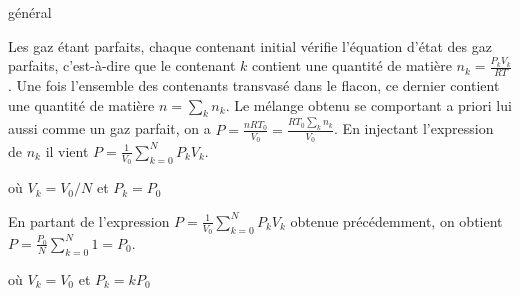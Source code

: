 \debutEntrainement


\begin{enonce}
général
\end{enonce}


\begin{corrige}
Les gaz étant parfaits, chaque contenant initial vérifie l'équation d'état des gaz parfaits, c'est-à-dire que le contenant $k$ contient une quantité de matière $n_k=\frac{P_kV_k}{RT}$. Une fois l'ensemble des contenants transvasé dans le flacon, ce dernier contient une quantité de matière $n=\textstyle \sum_{k} n_k$. Le mélange obtenu se comportant a priori lui aussi comme un gaz parfait, on a $P=\frac{nRT_0}{V_0}=\frac{RT_0 \sum_{k} n_k}{V_0}$. En injectant l'expression de $n_k$ il vient $P=\frac{1}{V_0} \sum_{k=0}^N P_k V_k$. 
\end{corrige}



\begin{enonce}
où $V_k=V_0/N$ et $P_k=P_0$
\end{enonce}


\begin{corrige}
En partant de l'expression $P=\frac{1}{V_0} \sum_{k=0}^N P_k V_k$ obtenue précédemment, on obtient $P=\frac{P_0}{N} \sum_{k=0}^N 1=P_0$.
\end{corrige}



\begin{enonce}
où $V_k=V_0$ et $P_k=kP_0$
\end{enonce}


